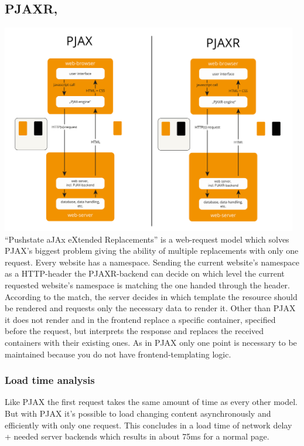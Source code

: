 \documentclass[f,bachelor,binding,twoside,palatino]{WeSTthesis}
\begin{document}
  \subsection{PJAXR, \label{pjaxr}}
    \includegraphics[width=13cm]{images/pjax_vs_pjaxr}\\
    \enquote{Pushstate aJAx eXtended Replacements} is a web-request model which solves \gls{PJAX}'s biggest problem giving the ability of multiple replacements with only one request. 
    Every website has a namespace.
    Sending the current website's namespace as a HTTP-header the \gls{PJAXR}-backend can decide on which level the current requested website's namespace is matching the one handed through the header.
    According to the match, the server decides in which template the resource should be rendered and requests only the necessary data to render it.
    Other than \gls{PJAX} it does not render and in the frontend replace a specific container, specified before the request, but interprets the response and replaces the received containers with their existing ones.
    As in \gls{PJAX} only one point is necessary to be maintained because you do not have frontend-templating logic.

    \subsubsection{Load time analysis}
      Like \gls{PJAX} the first request takes the same amount of time as every other model.
      But with \gls{PJAX} it's possible to load changing content asynchronously and efficiently with only one request.
      This concludes in a load time of network delay + needed server backends which results in about 75ms for a normal page.
    
\end{document}
